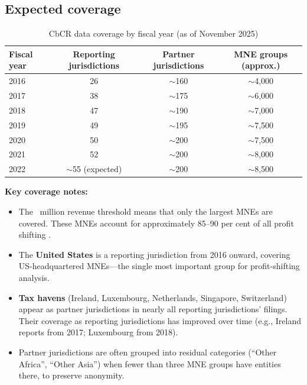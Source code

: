 \documentclass[12pt,a4paper]{article}
\begin{document}
\subsection{Expected coverage}\label{sec:cbcr_coverage}

\begin{table}[!ht]
\centering
\caption{CbCR data coverage by fiscal year (as of November 2025)}
\label{tab:cbcr_coverage}
\small
\begin{tabular}{lccc}
\toprule
\textbf{Fiscal year} & \textbf{Reporting jurisdictions} & \textbf{Partner jurisdictions} & \textbf{MNE groups (approx.)} \\
\midrule
2016 & 26 & $\sim$160 & $\sim$4{,}000 \\
2017 & 38 & $\sim$175 & $\sim$6{,}000 \\
2018 & 47 & $\sim$190 & $\sim$7{,}000 \\
2019 & 49 & $\sim$195 & $\sim$7{,}500 \\
2020 & 50 & $\sim$200 & $\sim$7{,}500 \\
2021 & 52 & $\sim$200 & $\sim$8{,}000 \\
2022 & $\sim$55 (expected) & $\sim$200 & $\sim$8{,}500 \\
\bottomrule
\end{tabular}
\end{table}

\noindent\textbf{Key coverage notes:}
\begin{itemize}
    \item The ~million revenue threshold means that only the largest MNEs are covered.
    These MNEs account for approximately 85--90 per cent of all profit shifting \parencite{oecd2025corptaxstats}.
    \item The \textbf{United States} is a reporting jurisdiction from 2016 onward, covering US-headquartered MNEs---the single most important group for profit-shifting analysis.
    \item \textbf{Tax havens} (Ireland, Luxembourg, Netherlands, Singapore, Switzerland) appear as partner jurisdictions in nearly all reporting jurisdictions' filings.
    Their coverage as reporting jurisdictions has improved over time (e.g., Ireland reports from 2017; Luxembourg from 2018).
    \item Partner jurisdictions are often grouped into residual categories (``Other Africa'', ``Other Asia'') when fewer than three MNE groups have entities there, to preserve anonymity.
\end{itemize}
\end{document}
